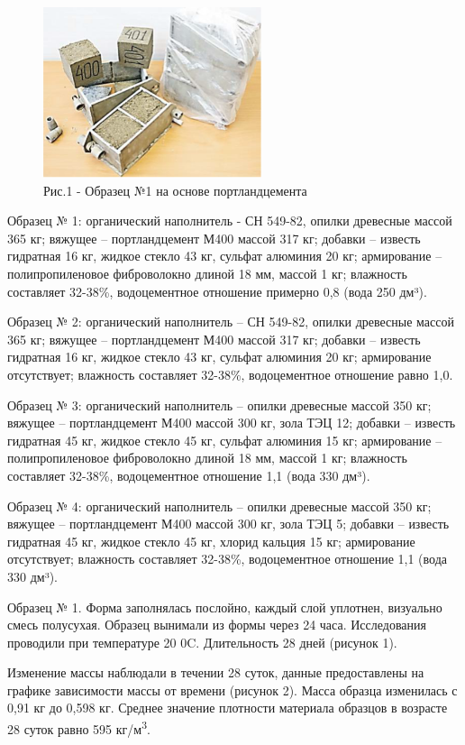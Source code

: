 \begin{figure}[H]
	\centering
	\includegraphics[width=0.57\textwidth]{media/chem/image2}
	\caption*{Рис.1 - Образец №1 на основе портландцемента}
\end{figure}

\begin{multicols}{2}
Образец № 1: органический наполнитель - СН 549-82, опилки древесные
массой 365 кг; вяжущее -- портландцемент М400 массой 317 кг; добавки --
известь гидратная 16 кг, жидкое стекло 43 кг, сульфат алюминия 20 кг;
армирование -- полипропиленовое фиброволокно длиной 18 мм, массой 1 кг;
влажность составляет 32-38\%, водоцементное отношение примерно 0,8 (вода
250 дм³).

Образец № 2: органический наполнитель -- СН 549-82, опилки древесные
массой 365 кг; вяжущее -- портландцемент М400 массой 317 кг; добавки --
известь гидратная 16 кг, жидкое стекло 43 кг, сульфат алюминия 20 кг;
армирование отсутствует; влажность составляет 32-38\%, водоцементное
отношение равно 1,0.

Образец № 3: органический наполнитель -- опилки древесные массой 350 кг;
вяжущее -- портландцемент М400 массой 300 кг, зола ТЭЦ 12; добавки --
известь гидратная 45 кг, жидкое стекло 45 кг, сульфат алюминия 15 кг;
армирование -- полипропиленовое фиброволокно длиной 18 мм, массой 1 кг;
влажность составляет 32-38\%, водоцементное отношение 1,1 (вода 330
дм³).

Образец № 4: органический наполнитель -- опилки древесные массой 350 кг;
вяжущее -- портландцемент М400 массой 300 кг, зола ТЭЦ 5; добавки --
известь гидратная 45 кг, жидкое стекло 45 кг, хлорид кальция 15 кг;
армирование отсутствует; влажность составляет 32-38\%, водоцементное
отношение 1,1 (вода 330 дм³).

Образец № 1. Форма заполнялась послойно, каждый слой уплотнен, визуально
смесь полусухая. Образец вынимали из формы через 24 часа. Исследования
проводили при температуре 20 0C. Длительность 28 дней (рисунок 1).

Изменение массы наблюдали в течении 28 суток, данные предоставлены на
графике зависимости массы от времени (рисунок 2). Масса образца
изменилась с 0,91 кг до 0,598 кг. Среднее значение плотности материала
образцов в возрасте 28 суток равно 595 кг/м\textsuperscript{3}.
\end{multicols}


